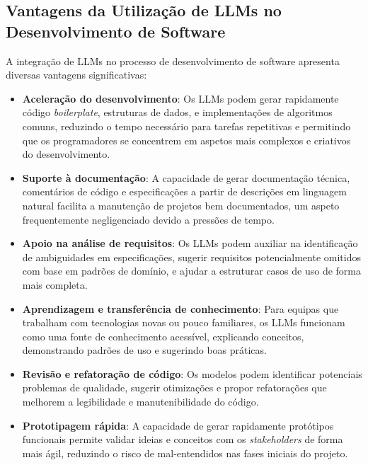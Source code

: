 \documentclass[a4paper,12pt]{scrreprt}
\begin{document}
\subsection{Vantagens da Utilização de LLMs no Desenvolvimento de Software}

A integração de LLMs no processo de desenvolvimento de software apresenta diversas vantagens significativas:

\begin{itemize}
    \item \textbf{Aceleração do desenvolvimento}: Os LLMs podem gerar rapidamente código \textit{boilerplate}, estruturas de dados, e implementações de algoritmos comuns, reduzindo o tempo necessário para tarefas repetitivas e permitindo que os programadores se concentrem em aspetos mais complexos e criativos do desenvolvimento.

    \item \textbf{Suporte à documentação}: A capacidade de gerar documentação técnica, comentários de código e especificações a partir de descrições em linguagem natural facilita a manutenção de projetos bem documentados, um aspeto frequentemente negligenciado devido a pressões de tempo.

    \item \textbf{Apoio na análise de requisitos}: Os LLMs podem auxiliar na identificação de ambiguidades em especificações, sugerir requisitos potencialmente omitidos com base em padrões de domínio, e ajudar a estruturar casos de uso de forma mais completa.

    \item \textbf{Aprendizagem e transferência de conhecimento}: Para equipas que trabalham com tecnologias novas ou pouco familiares, os LLMs funcionam como uma fonte de conhecimento acessível, explicando conceitos, demonstrando padrões de uso e sugerindo boas práticas.

    \item \textbf{Revisão e refatoração de código}: Os modelos podem identificar potenciais problemas de qualidade, sugerir otimizações e propor refatorações que melhorem a legibilidade e manutenibilidade do código.

    \item \textbf{Prototipagem rápida}: A capacidade de gerar rapidamente protótipos funcionais permite validar ideias e conceitos com os \textit{stakeholders} de forma mais ágil, reduzindo o risco de mal-entendidos nas fases iniciais do projeto.
\end{itemize}
\end{document}
